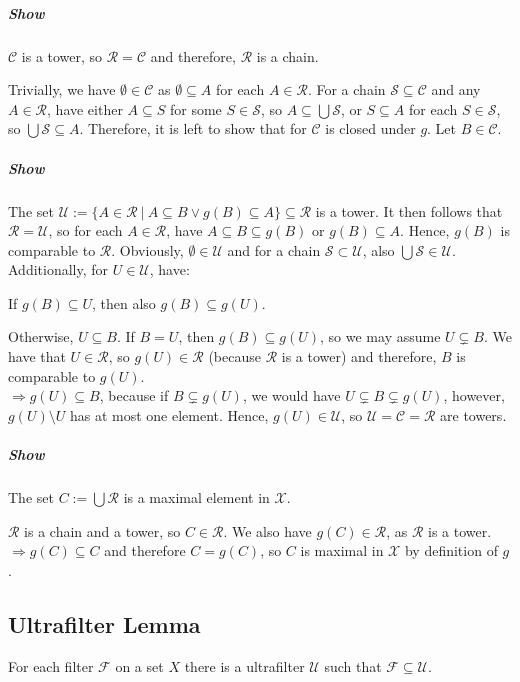 \documentclass{scrartcl}
\begin{document}
\subparagraph{Show} $\mathcal{C}$ is a tower, so $\mathcal{R} = \mathcal{C}$ and therefore, $\mathcal{R}$ is a chain.

Trivially, we have $\emptyset \in \mathcal{C}$ as $\emptyset \subseteq A$ for each $A \in \mathcal{R}$. For a chain $\mathcal{S} \subseteq \mathcal{C}$ and any $A \in \mathcal{R}$, have either $A \subseteq S$ for some $S \in \mathcal{S}$, so $A \subseteq \bigcup \mathcal{S}$, or $S \subseteq A$ for each $S \in \mathcal{S}$, so $\bigcup \mathcal{S} \subseteq A$. 
Therefore, it is left to show that for $\mathcal{C}$ is closed under $g$. Let $B \in \mathcal{C}$.

\subparagraph{Show} The set $\mathcal{U} := \{ A \in \mathcal{R} \ | \ A \subseteq B \vee g(B) \subseteq A \} \subseteq \mathcal{R}$ is a tower. It then follows that $\mathcal{R} = \mathcal{U}$, so for each $A \in \mathcal{R}$, have $A \subseteq B \subseteq g(B)$ or $g(B) \subseteq A$. Hence, $g(B)$ is comparable to $\mathcal{R}$. Obviously, $\emptyset \in \mathcal{U}$ and for a chain $\mathcal{S} \subset \mathcal{U}$, also $\bigcup \mathcal{S} \in \mathcal{U}$. Additionally, for $U \in \mathcal{U}$, have:

If $g(B) \subseteq U$, then also $g(B) \subseteq g(U)$. 

Otherwise, $U \subseteq B$. If $B = U$, then $g(B) \subseteq g(U)$, so we may assume $U \subsetneq B$. We have that $U \in \mathcal{R}$, so $g(U) \in \mathcal{R}$ (because $\mathcal{R}$ is a tower) and therefore, $B$ is comparable to $g(U)$.
\\$\Rightarrow g(U) \subseteq B$, because if $B \subsetneq g(U)$, we would have $U \subsetneq B \subsetneq g(U)$, however, $g(U) \setminus U$ has at most one element. Hence, $g(U) \in \mathcal{U}$, so $\mathcal{U} = \mathcal{C} = \mathcal{R}$ are towers.

\subparagraph{Show} The set $C := \bigcup \mathcal{R}$ is a maximal element in $\mathcal{X}$.

$\mathcal{R}$ is a chain and a tower, so $C \in \mathcal{R}$. We also have $g(C) \in \mathcal{R}$, as $\mathcal{R}$ is a tower.
\\$\Rightarrow g(C) \subseteq C$ and therefore $C = g(C)$, so $C$ is maximal in $\mathcal{X}$ by definition of $g$.

\subsection{Ultrafilter Lemma}
For each filter $\mathcal{F}$ on a set $X$ there is a ultrafilter $\mathcal{U}$ such that $\mathcal{F} \subseteq \mathcal{U}$. 
\end{document}

